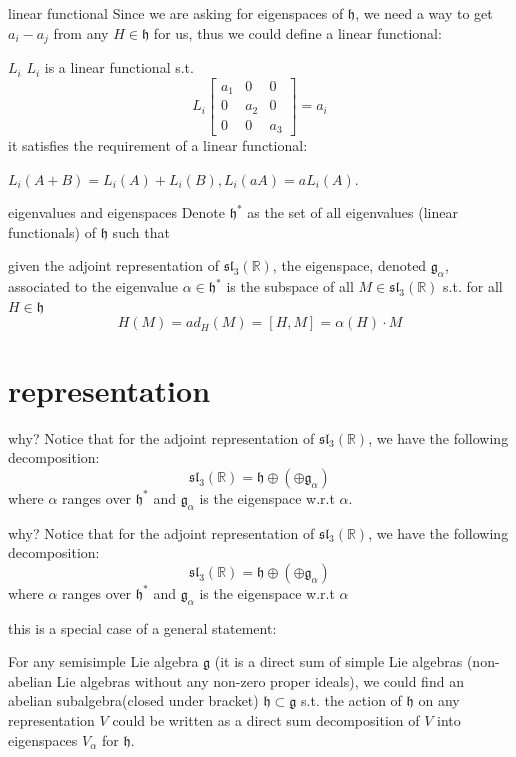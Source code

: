 \documentclass{beamer}
\newcommand{\R}{\mathbb{R}}
\begin{document}
\begin{frame}{linear functional}	
	Since we are asking for  eigenspaces of $\mathfrak{h}$, we need a way to get  $a_i-a_j$ from any  $H \in \mathfrak{h}$ for us, thus we could define a linear functional:

	\begin{defn}{$L_i$}{}
	$L_i$ is a linear functional s.t. \[
		L_i \begin{bmatrix} a_1 & 0 &0 \\ 0 & a_2 & 0 \\ 0 &0 &a_3 \end{bmatrix} = a_i 
	\] it satisfies the requirement of a linear functional: 

	$L_i(A+B) = L_i(A) + L_i(B), L_i(aA) = aL_i(A)$.
	\end{defn}
\end{frame}

\begin{frame}{eigenvalues and eigenspaces}
	Denote $\mathfrak{h}^*$ as the set of all eigenvalues (linear functionals) of  $\mathfrak{h}$ such that
	
	given the adjoint representation of  $\mathfrak{sl}_3(\R)$, the eigenspace, denoted $\mathfrak{g}_{\alpha}$, associated to the eigenvalue $\alpha \in \mathfrak{h}^*$ is the subspace of all  $M \in \mathfrak{sl}_3(\R)$ s.t. for all $H \in \mathfrak{h}$ \[
	H(M) = ad_H(M) = [H, M] = \alpha(H) \cdot M
\] 
\end{frame}


\section{representation}

\begin{frame}{why?}
	Notice that for the adjoint representation of $\mathfrak{sl}_3(\R)$, we have the following decomposition:  \[
		\mathfrak{sl}_3(\R) = \mathfrak{h} \oplus \left( \oplus \mathfrak{g}_\alpha \right) 
	\] where $\alpha$ ranges over $\mathfrak{h}^*$ and $\mathfrak{g}_{\alpha}$ is the eigenspace w.r.t $\alpha$.
\end{frame}

\begin{frame}{why?}
	Notice that for the adjoint representation of $\mathfrak{sl}_3(\R)$, we have the following decomposition:  \[
		\mathfrak{sl}_3(\R) = \mathfrak{h} \oplus \left( \oplus \mathfrak{g}_\alpha \right) 
	\] where $\alpha$ ranges over $\mathfrak{h}^*$ and $\mathfrak{g}_{\alpha}$ is the eigenspace w.r.t $\alpha$

	this is a special case of a general statement:
	\begin{theom}{}{}
		For any semisimple Lie algebra $\mathfrak{g}$ (it is a direct sum of simple Lie algebras (non-abelian Lie algebras without any non-zero proper ideals), we could find an abelian subalgebra(closed under bracket)  $\mathfrak{h} \subset \mathfrak{g}$ s.t. the action of $\mathfrak{h}$ on any representation $V$ could be written as a direct sum decomposition of $V$ into eigenspaces  $V_{\alpha}$ for $\mathfrak{h}$.
	\end{theom}
\end{frame}
\end{document}
